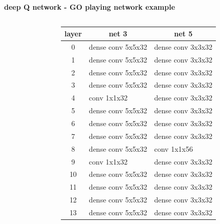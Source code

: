 \documentclass[xcolor=dvipsnames]{beamer}
\begin{document}
\begin{frame}{\bf deep Q network - GO playing network example}
\begin{columns}
\begin{column}{0.2\textwidth}
    \end{column}
    \begin{column}{0.8\textwidth}

    {\fontsize{8}{3}\selectfont

    \begin{table}[]
    \begin{tabular}{|c|l|l|}
    \hline
    \textbf{layer} & \multicolumn{1}{c|}{\textbf{net 3}}       & \multicolumn{1}{c|}{\textbf{net 5}}       \\ \hline
    0              & \cellcolor[HTML]{FD6864}dense conv 5x5x32 & \cellcolor[HTML]{FD6864}dense conv 3x3x32 \\ \hline
    1              & \cellcolor[HTML]{FD6864}dense conv 5x5x32 & \cellcolor[HTML]{FD6864}dense conv 3x3x32 \\ \hline
    2              & \cellcolor[HTML]{FD6864}dense conv 5x5x32 & \cellcolor[HTML]{FD6864}dense conv 3x3x32 \\ \hline
    3              & \cellcolor[HTML]{FD6864}dense conv 5x5x32 & \cellcolor[HTML]{FD6864}dense conv 3x3x32 \\ \hline
    4              & \cellcolor[HTML]{38FFF8}conv 1x1x32       & \cellcolor[HTML]{FD6864}dense conv 3x3x32 \\ \hline
    5              & \cellcolor[HTML]{FD6864}dense conv 5x5x32 & \cellcolor[HTML]{FD6864}dense conv 3x3x32 \\ \hline
    6              & \cellcolor[HTML]{FD6864}dense conv 5x5x32 & \cellcolor[HTML]{FD6864}dense conv 3x3x32 \\ \hline
    7              & \cellcolor[HTML]{FD6864}dense conv 5x5x32 & \cellcolor[HTML]{FD6864}dense conv 3x3x32 \\ \hline
    8              & \cellcolor[HTML]{FD6864}dense conv 5x5x32 & \cellcolor[HTML]{38FFF8}conv 1x1x56       \\ \hline
    9              & \cellcolor[HTML]{38FFF8}conv 1x1x32       & \cellcolor[HTML]{FD6864}dense conv 3x3x32 \\ \hline
    10             & \cellcolor[HTML]{FD6864}dense conv 5x5x32 & \cellcolor[HTML]{FD6864}dense conv 3x3x32 \\ \hline
    11             & \cellcolor[HTML]{FD6864}dense conv 5x5x32 & \cellcolor[HTML]{FD6864}dense conv 3x3x32 \\ \hline
    12             & \cellcolor[HTML]{FD6864}dense conv 5x5x32 & \cellcolor[HTML]{FD6864}dense conv 3x3x32 \\ \hline
    13             & \cellcolor[HTML]{FD6864}dense conv 5x5x32 & \cellcolor[HTML]{FD6864}dense conv 3x3x32 \\ \hline

\end{tabular}
\end{table}}
\end{column}
\end{columns}
\end{frame}
\end{document}
